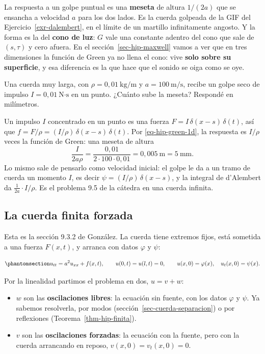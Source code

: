 \documentclass[
  spanish,
  a4paper,
]{scrbook}
\providecommand{\tightlist}{%
  \setlength{\itemsep}{0pt}\setlength{\parskip}{0pt}}
\theoremstyle{definition}
\theoremstyle{plain}
\theoremstyle{definition}
\theoremstyle{plain}
\theoremstyle{definition}
\theoremstyle{remark}
\begin{document}
La respuesta a un golpe puntual es una \textbf{meseta} de altura
\(1/(2a)\) que se ensancha a velocidad \(a\) para los dos lados. Es la
cuerda golpeada de la GIF del Ejercicio~\ref{exr-dalembert}, en el
límite de un martillo infinitamente angosto. Y la forma es la del
\textbf{cono de luz}: \(G\) vale una constante adentro del cono que sale
de \((s,\tau)\) y cero afuera. En el sección~\ref{sec-hip-maxwell} vamos
a ver que en tres dimensiones la función de Green ya no llena el cono:
vive \textbf{solo sobre su superficie}, y esa diferencia es la que hace
que el sonido se oiga como se oye.

Una cuerda muy larga, con \(\rho = 0{,}01\ \text{kg/m}\) y
\(a = 100\ \text{m/s}\), recibe un golpe seco de impulso
\(I = 0{,}01\ \text{N·s}\) en un punto. ¿Cuánto sube la meseta? Respondé
en milímetros.

Un impulso \(I\) concentrado en un punto es una fuerza
\(F = I\,\delta(x-s)\,\delta(t)\), así que
\(f = F/\rho = (I/\rho)\,\delta(x-s)\,\delta(t)\). Por
\ref{eq-hip-green-1d}, la respuesta es \(I/\rho\) veces la función de
Green: una meseta de altura \[
\frac{I}{2a\rho} = \frac{0{,}01}{2\cdot100\cdot0{,}01} = 0{,}005\ \text{m} = 5\ \text{mm}.
\] Lo mismo sale de pensarlo como velocidad inicial: el golpe le da a un
tramo de cuerda un momento \(I\), es decir
\(\psi = (I/\rho)\,\delta(x-s)\), y la integral de d'Alembert da
\(\tfrac{1}{2a}\cdot I/\rho\). Es el problema 9.5 de la cátedra en una
cuerda infinita.

\subsection{La cuerda finita forzada}\label{sec-hip-forzada}

Esta es la sección 9.3.2 de González. La cuerda tiene extremos fijos,
está sometida a una fuerza \(F(x,t)\), y arranca con datos \(\varphi\) y
\(\psi\):

\begin{equation}\protect\phantomsection\label{eq-hip-forzada}{
u_{tt} = a^2u_{xx} + f(x,t),\qquad u(0,t) = u(l,t) = 0,\qquad u(x,0) = \varphi(x),\quad u_t(x,0) = \psi(x).
}\end{equation}

Por la linealidad partimos el problema en dos, \(u = v + w\):

\begin{itemize}
\tightlist
\item
  \(w\) son las \textbf{oscilaciones libres}: la ecuación sin fuente,
  con los datos \(\varphi\) y \(\psi\). Ya sabemos resolverla, por modos
  (sección~\ref{sec-cuerda-separacion}) o por reflexiones
  (Teorema~\ref{thm-hip-finita}).
\item
  \(v\) son las \textbf{oscilaciones forzadas}: la ecuación con la
  fuente, pero con la cuerda arrancando en reposo,
  \(v(x,0) = v_t(x,0) = 0\).
\end{itemize}
\end{document}
